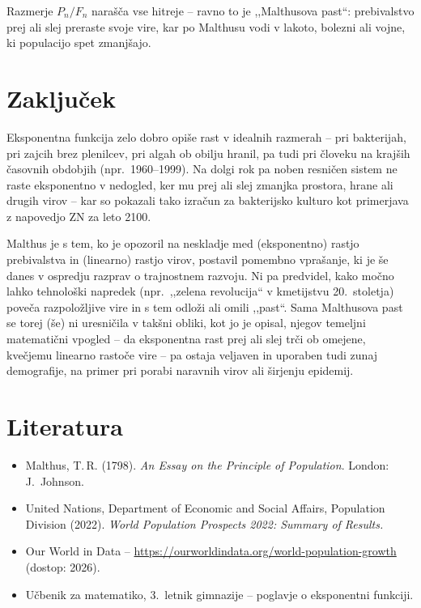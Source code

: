 \documentclass[11pt,a4paper]{article}
\begin{document}
Razmerje $P_n/F_n$ narašča vse hitreje -- ravno to je ,,Malthusova past``: prebivalstvo prej ali slej preraste svoje vire, kar po Malthusu vodi v lakoto, bolezni ali vojne, ki populacijo spet zmanjšajo.
 
\section*{Zaključek}
 
Eksponentna funkcija zelo dobro opiše rast v idealnih razmerah -- pri bakterijah, pri zajcih brez plenilcev, pri algah ob obilju hranil, pa tudi pri človeku na krajših časovnih obdobjih (npr.\ 1960--1999). Na dolgi rok pa noben resničen sistem ne raste eksponentno v nedogled, ker mu prej ali slej zmanjka prostora, hrane ali drugih virov -- kar so pokazali tako izračun za bakterijsko kulturo kot primerjava z napovedjo ZN za leto 2100.
 
Malthus je s tem, ko je opozoril na neskladje med (eksponentno) rastjo prebivalstva in (linearno) rastjo virov, postavil pomembno vprašanje, ki je še danes v ospredju razprav o trajnostnem razvoju. Ni pa predvidel, kako močno lahko tehnološki napredek (npr.\ ,,zelena revolucija`` v kmetijstvu 20.\ stoletja) poveča razpoložljive vire in s tem odloži ali omili ,,past``. Sama Malthusova past se torej (še) ni uresničila v takšni obliki, kot jo je opisal, njegov temeljni matematični vpogled -- da eksponentna rast prej ali slej trči ob omejene, kvečjemu linearno rastoče vire -- pa ostaja veljaven in uporaben tudi zunaj demografije, na primer pri porabi naravnih virov ali širjenju epidemij.
 
\section*{Literatura}
 
\begin{itemize}
  \item Malthus, T.\,R. (1798). \textit{An Essay on the Principle of Population}. London: J.\ Johnson.
  \item United Nations, Department of Economic and Social Affairs, Population Division (2022). \textit{World Population Prospects 2022: Summary of Results.}
  \item Our World in Data -- \url{https://ourworldindata.org/world-population-growth} (dostop: 2026).
  \item Učbenik za matematiko, 3.\ letnik gimnazije -- poglavje o eksponentni funkciji.
\end{itemize}
 
\end{document}
